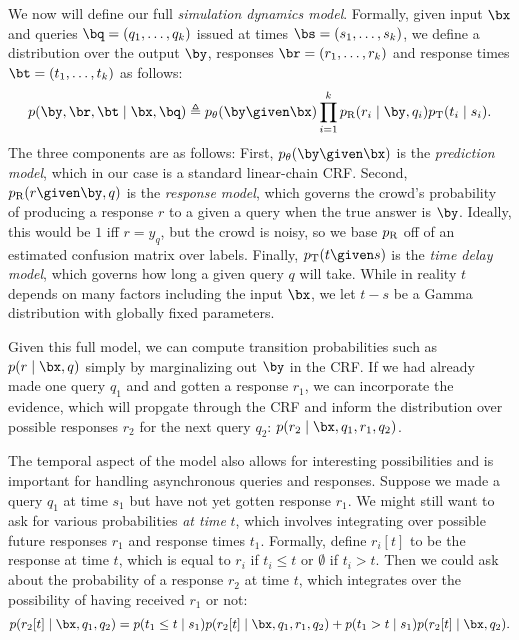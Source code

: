 We now will define our full \emph{simulation dynamics model}.
Formally, given input $\bx$ and queries $\bq = (q_1, \dots, q_k)$ issued at times $\bs = (s_1, \dots, s_k)$,
we define a distribution over the output $\by$, responses $\br = (r_1, \dots, r_k)$
and response times $\bt = (t_1, \dots, t_k)$ as follows:
\begin{align}
p(\by, \br, \bt \mid \bx, \bq) \eqdef \p(\by \given \bx) \prod_{i=1}^k \presp(r_i \mid \by, q_i) \ptime(t_i \mid s_i).
\end{align}
The three components are as follows:
First, $\p(\by \given \bx)$ is the \emph{prediction model},
which in our case is a standard linear-chain CRF.
Second, $\presp(r \given \by, q)$ is the \emph{response model},
which governs the crowd's probability of producing a response $r$ to a given a query when the true answer is $\by$.
Ideally, this would be $1$ iff $r = y_q$, but the crowd is noisy,
so we base $p_{\text{R}}$ off of an estimated confusion matrix over labels.
Finally, $\ptime(t \given s)$ is the \emph{time delay model},
which governs how long a given query $q$ will take.
While in reality $t$ depends on many factors including the input $\bx$,
we let $t - s$ be a Gamma distribution with globally fixed parameters.

Given this full model, we can compute transition probabilities such as $p(r \mid \bx, q)$
simply by marginalizing out $\by$ in the CRF.
If we had already made one query $q_1$ and and gotten a response $r_1$,
we can incorporate the evidence, which will propgate through the CRF
and inform the distribution over possible responses $r_2$ for the next query $q_2$:
$p(r_2 \mid \bx, q_1, r_1, q_2)$.

The temporal aspect of the model also allows for interesting possibilities
and is important for handling asynchronous queries and responses.
Suppose we made a query $q_1$ at time $s_1$ but have not yet gotten response $r_1$.
We might still want to ask for various probabilities \emph{at time} $t$,
which involves integrating over possible future responses $r_1$ and response times $t_1$.
Formally, define $r_i[t]$ to be the response at time $t$, which is equal to $r_i$ if $t_i \le t$
or $\emptyset$ if $t_i > t$.
Then we could ask about the probability of a response $r_2$ at time $t$,
which integrates over the possibility of having received $r_1$ or not:
\begin{align}
p(r_2[t] \mid \bx, q_1, q_2) = p(t_1 \le t \mid s_1) p(r_2[t] \mid \bx, q_1, r_1, q_2) + p(t_1 > t \mid s_1) p(r_2[t] \mid \bx, q_2).
\end{align}

